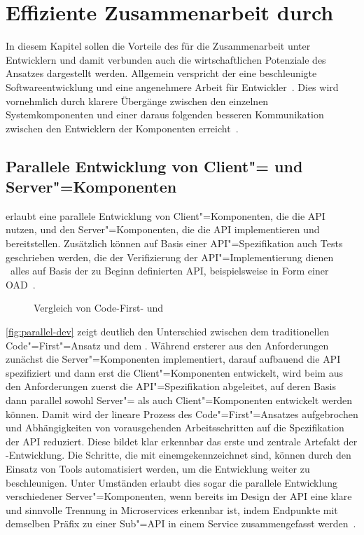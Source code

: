 \chapter{Effiziente Zusammenarbeit durch \AF}
In diesem Kapitel sollen die Vorteile des \AFAes für die Zusammenarbeit unter Entwicklern und damit verbunden auch die wirtschaftlichen Potenziale des Ansatzes dargestellt werden.
Allgemein verspricht der \AFA eine beschleunigte Softwareentwicklung und eine angenehmere Arbeit für Entwickler~\cite[354\psq]{de23}.
Dies wird vornehmlich durch klarere Übergänge zwischen den einzelnen Systemkomponenten und einer daraus folgenden besseren Kommunikation zwischen den Entwicklern der Komponenten erreicht~\cite[75]{bea22}.

\section{Parallele Entwicklung von Client"= und Server"=Komponenten} \label{sec:parallel-dev}
\AF erlaubt eine parallele Entwicklung von Client"=Komponenten, die die \ac{API} nutzen, und den Server"=Komponenten, die die \ac{API} implementieren und bereitstellen.
Zusätzlich können auf Basis einer \ac{API}"=Spezifikation auch Tests geschrieben werden, die der Verifizierung der \ac{API}"=Implementierung dienen \textendash\ alles auf Basis der zu Beginn definierten \ac{API}, beispielsweise in Form einer \ac{OAD}~\cite{vol22}.

\begin{figure}[hb]
	\centering
	\qquad
	\subfloat[\centering \AFA]{\label{fig:api-first}}
	\caption{Vergleich von Code-First- und \AFA}
	\label{fig:parallel-dev}
\end{figure}

\autoref{fig:parallel-dev} zeigt deutlich den Unterschied zwischen dem traditionellen Code"=First"=Ansatz und dem \AFA.
Während ersterer aus den Anforderungen zunächst die Server"=Komponenten implementiert, darauf aufbauend die \ac{API} spezifiziert und dann erst die Client"=Komponenten entwickelt, wird beim \AFA aus den Anforderungen zuerst die \ac{API}"=Spezifikation abgeleitet, auf deren Basis dann parallel sowohl Server"= als auch Client"=Komponenten entwickelt werden können.
Damit wird der lineare Prozess des Code"=First"=Ansatzes aufgebrochen und Abhängigkeiten von vorausgehenden Arbeitsschritten auf die Spezifikation der \ac{API} reduziert.
Diese bildet klar erkennbar das erste und zentrale Artefakt der \AF-Entwicklung.
Die Schritte, die mit einem\;{\footnotesize\faCog}\;gekennzeichnet sind, können durch den Einsatz von Tools automatisiert werden, um die Entwicklung weiter zu beschleunigen.
Unter Umständen erlaubt dies sogar die parallele Entwicklung verschiedener Server"=Komponenten, wenn bereits im Design der \ac{API} eine klare und sinnvolle Trennung in Microservices erkennbar ist, indem \bspw Endpunkte mit demselben Präfix zu einer Sub"=\ac{API} in einem Service zusammengefasst werden~\cite[354]{de23}.


